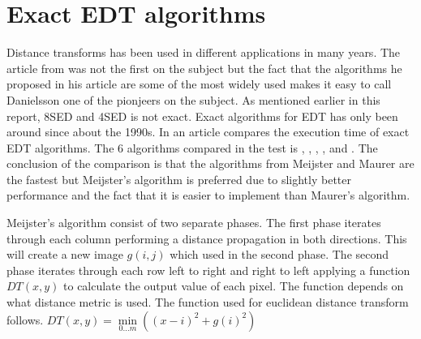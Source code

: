 \section{Exact EDT algorithms}\label{exactEDT}
Distance transforms has been used in different applications in many years. The article from \citet{Danielsson} was not the first on the subject but the fact that the algorithms he proposed in his article are some of the most widely used\citep{edtcompare} makes it easy to call Danielsson one of the pionjeers on the subject. As mentioned earlier in this report, 8SED and 4SED is not exact. Exact algorithms for EDT has only been around since about the 1990s. In an article \citet{edtcompare} compares the execution time of exact EDT algorithms. The 6 algorithms compared in the test is \citet{meijster}, \citet{maurer}, \citet{eggers}, \citet{lotufo}, \citet{cuisenaire} and \citet{saito}. The conclusion of the comparison is that the algorithms from Meijster and Maurer are the fastest but Meijster's algorithm is preferred due to slightly better performance and the fact that it is easier to implement than Maurer's algorithm.

Meijster's algorithm consist of two separate phases. The first phase iterates through each column performing a distance propagation in both directions. This will create a new image \begin{math}g(i, j)\end{math} which used in the second phase. The second phase iterates through each row left to right and right to left applying a function \begin{math}DT(x, y)\end{math} to calculate the output value of each pixel. The function depends on what distance metric is used. The function used for euclidean distance transform follows.\vspace{\baselineskip}\newline
\begin{math}
	DT(x, y) = \min\limits_{0\dots m}((x-i)^2+g(i)^2)
\end{math}\vspace{\baselineskip}\newline

